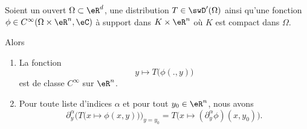 \begin{proposition}     \label{PROPooCNYTooWCKHpV}
	Soient un ouvert \( \Omega\subset \eR^d\), une distribution \( T\in \swD'(\Omega)\) ainsi qu'une fonction \( \phi\in C^{\infty}(\Omega\times \eR^n,\eC)\) à support dans \( K\times \eR^n\) où \( K\) est compact dans \( \Omega\).

	Alors
	\begin{enumerate}
		\item       \label{ITEMooBIVOooHwGglM}
		      La fonction
		      \begin{equation}
			      y\mapsto T\big( \phi(.,y) \big)
		      \end{equation}
		      est de classe \(  C^{\infty}\) sur \( \eR^n\).
		\item
		      Pour toute liste d'indices \( \alpha\) et pour tout \( y_0\in \eR^n\), nous avons
		      \begin{equation}        \label{EQooYMXXooYkceTv}
			      \partial_y^{\alpha}\big( T\big( x\mapsto \phi(x,y) \big) \big)_{y=y_0}= T\big( x\mapsto(\partial_{y}^{\alpha}\phi)(x,y_0) \big).
		      \end{equation}
	\end{enumerate}
\end{proposition}

